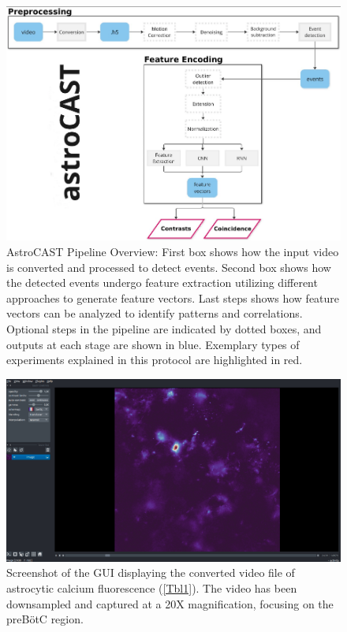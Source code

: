 \begin{figure}[h!]
\begin{center}
\includegraphics[width=\linewidth]{figures/1.png}
\end{center}
\caption{AstroCAST Pipeline Overview: First box shows how the input video is converted and processed to detect events. Second box shows how the detected events undergo feature extraction utilizing different approaches to generate feature vectors. Last steps shows how feature vectors can be analyzed to identify patterns and correlations. Optional steps in the pipeline are indicated by dotted boxes, and outputs at each stage are shown in blue. Exemplary types of experiments explained in this protocol are highlighted in red.}\label{fig:1}
\end{figure}

\begin{figure}[h!]
\begin{center}
\includegraphics[width=\linewidth]{figures/2.png}
\end{center}
\caption{Screenshot of the \ac{GUI} displaying the converted video file of astrocytic calcium fluorescence (\ref{Tbl1}). The video has been downsampled and captured at a 20X magnification, focusing on the \ac{preBötC} region.}\label{fig:2}
\end{figure}

